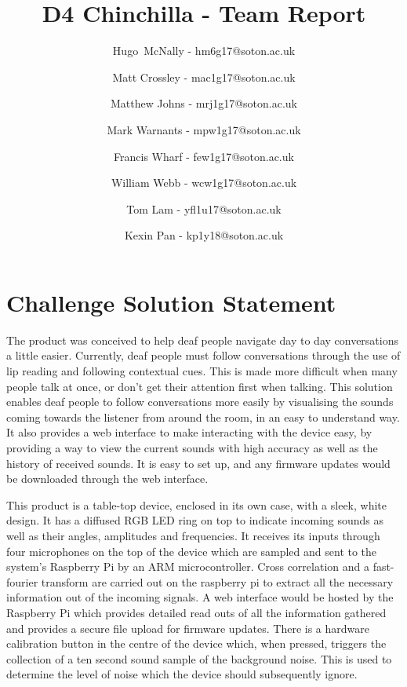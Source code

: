 \documentclass[a4paper]{article}
\begin{document}
\title{D4 Chinchilla - Team Report}
\author{
Hugo~McNally - hm6g17@soton.ac.uk
\and
Matt Crossley - mac1g17@soton.ac.uk
\and
Matthew Johns - mrj1g17@soton.ac.uk
\and
Mark Warnants - mpw1g17@soton.ac.uk
\and
Francis Wharf - few1g17@soton.ac.uk
\and
William Webb - wcw1g17@soton.ac.uk
\and
Tom Lam - yfl1u17@soton.ac.uk
\and
Kexin Pan - kp1y18@soton.ac.uk
}
\maketitle


\section{Challenge Solution Statement}
The product was conceived to help deaf people navigate day to day conversations
a little easier. Currently, deaf people must follow conversations through the
use of lip reading and following contextual cues. This is made more difficult
when many people talk at once, or don’t get their attention first when talking.
This solution enables deaf people to follow conversations more easily by
visualising the sounds coming towards the listener from around the room, in an
easy to understand way. It also provides a web interface to make interacting
with the device easy, by providing a way to view the current sounds with high
accuracy as well as the history of received sounds. It is easy to set up, and
any firmware updates would be downloaded through the web interface.

This product is a table-top device, enclosed in its own case, with a sleek,
white design. It has a diffused RGB LED ring on top to indicate incoming sounds
as well as their angles, amplitudes and frequencies. It receives its inputs
through four microphones on the top of the device which are sampled and sent to
the system's Raspberry Pi by an ARM microcontroller. Cross correlation and a
fast-fourier transform are carried out on the raspberry pi to extract all the
necessary information out of the incoming signals. A web interface would be
hosted by the Raspberry Pi which provides detailed read outs of all the
information gathered and provides a secure file upload for firmware updates.
There is a hardware calibration button in the centre of the device which,
when pressed, triggers the collection of a ten second sound sample of the
background noise. This is used to determine the level of noise which the device
should subsequently ignore.
\end{document}
